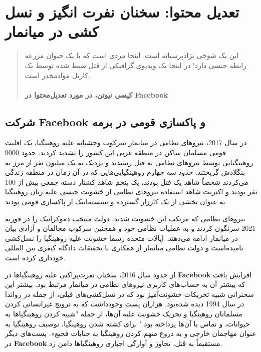

\chapter{تعدیل محتوا: سخنان نفرت انگیز و نسل کشی در میانمار}
\label{ch:تعدیل محتوا سخنان نفرت انگیز و نسل کشی در میانمار}

\begin{quote}
    این یک شوخی نژادپرستانه است.
    اینجا مردی است که با یک حیوان مزرعه رابطه جنسی دارد!
    در اینجا یک ویدیوی گرافیکی از قتل ضبط شده توسط یک کارتل مواد‌مخدر است.
    \\\\
    \textbf{کیسی نیوتن، در مورد تعدیل‌محتوا در \textenglish{\textbf{Facebook}}}
    \newline
\end{quote}


{
\section*{شرکت \textenglish{\textbf{Facebook}} و پاکسازی قومی در برمه}
\label{sec:شرکت Facebook و پاکسازی قومی در برمه}
در سال 2017، نیروهای نظامی در میانمار سرکوب وحشیانه علیه روهینگیا، یک اقلیت قومی مسلمان ساکن در منطقه غربی این کشور را تشدید کردند. حدود 9000 روهینگیایی توسط نیروهای نظامی به قتل رسیدند و نزدیک به یک میلیون نفر از مرز به بنگلادش گریختند. حدود سه چهارم روهینگیایی‌هایی که در آن زمان در منطقه زندگی می‌کردند شخصاً شاهد یک قتل بودند، یک پنجم شاهد کشتار دسته جمعی بیش از 100 نفر بودند و اکثریت شاهد استفاده نیروهای نظامی از خشونت جنسی علیه زنان روهینگیا به عنوان بخشی از یک کارزار گسترده و سیستماتیک از پاکسازی قومی بودند.
}
نیروهای نظامی که مرتکب این خشونت شدند، دولت منتخب دموکراتیک را در فوریه 2021 سرنگون کردند و به عملیات نظامی خود و همچنین سرکوب مخالفان و آزادی بیان در میانمار ادامه می‌دهند.
ایالات متحده رسما خشونت علیه روهینگیا را نسل‌کشی نامیده‌است و دولت نظامی میانمار از همکاری با تحقیقات دادگاه کیفری بین المللی خودداری کرده است.

از حدود سال 2016، سخنان نفرت‌پراکنی علیه روهینگیاها در \textenglish{\textbf{Facebook}} افزایش یافت که بیشتر آن به حساب‌های کاربری نیروهای نظامی در میانمار مرتبط بود.
بیشتر این سخنرانی شبیه تحریکات خشونت‌آمیز بود که در نسل‌کشی‌های قبلی، از جمله در رواندا در سال 1994 دیده شده‌بود.
هزاران پست وجود‌داشت که به ترویج غیرانسانی کردن مسلمانان روهینگیا و تحریک خشونت علیه آن‌ها، از جمله "شبیه کردن روهینگیاها به حیوانات، و تماس با آن‌ها پرداخته بود." برای کشته شدن روهینگیا، توصیف روهینگیا به عنوان مهاجمان خارجی و به دروغ متهم کردن روهینگیا به جنایات فجیع».
پست‌های دیگر در \textenglish{\textbf{Facebook}} مستقیماً به قتل، تجاوز و آوارگی اجباری روهینگیاها دامن زد.

